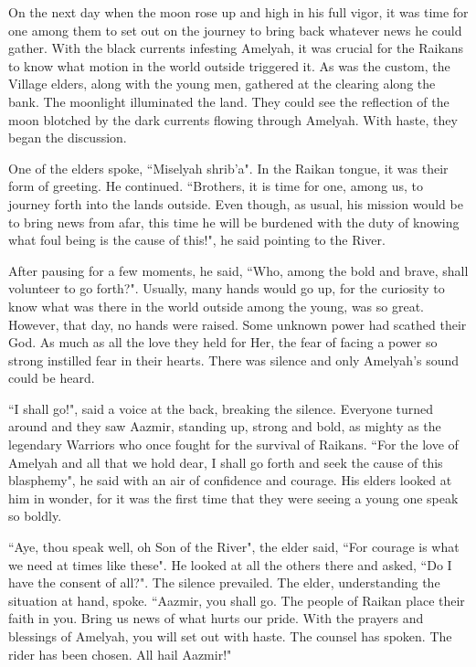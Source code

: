 \documentclass[twoside,11pt,titlepage]{article}
\begin{document}
On the next day when the moon rose up and high in his full vigor, it was time for one among them to set out on the journey to bring back whatever news he could gather. With the black currents infesting Amelyah, it was crucial for the Raikans to know what motion in the world outside triggered it. As was the custom, the Village elders, along with the young men, gathered at the clearing along the bank. The moonlight illuminated the land. They could see the reflection of the moon blotched by the dark currents flowing through Amelyah. With haste, they began the discussion.

One of the elders spoke, ``Miselyah shrib'a". In the Raikan tongue, it was their form of greeting. He continued. ``Brothers, it is time for one, among us, to journey forth into the lands outside. Even though, as usual, his mission would be to bring news from afar, this time he will be burdened with the duty of knowing what foul being is the cause of this!", he said pointing to the River.

After pausing for a few moments, he said, ``Who, among the bold and brave, shall volunteer to go forth?". Usually, many hands would go up, for the curiosity to know what was there in the world outside among the young, was so great. However, that day, no hands were raised. Some unknown power had scathed their God. As much as all the love they held for Her, the fear of facing a power so strong instilled fear in their hearts. There was silence and only Amelyah's sound could be heard.

``I shall go!", said a voice at the back, breaking the silence. Everyone turned around and they saw Aazmir, standing up, strong and bold, as mighty as the legendary Warriors who once fought for the survival of Raikans. ``For the love of Amelyah and all that we hold dear, I shall go forth and seek the cause of this blasphemy", he said with an air of confidence and courage. His elders looked at him in wonder, for it was the first time that they were seeing a young one speak so boldly.

``Aye, thou speak well, oh Son of the River", the elder said, ``For courage is what we need at times like these". He looked at all the others there and asked, ``Do I have the consent of all?". The silence prevailed. The elder, understanding the situation at hand, spoke. ``Aazmir, you shall go. The people of Raikan place their faith in you. Bring us news of what hurts our pride. With the prayers and blessings of Amelyah, you will set out with haste. The counsel has spoken. The rider has been chosen. All hail Aazmir!"
\end{document}
